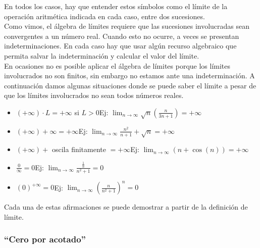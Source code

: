 \documentclass[../Teoría.root.tex]{subfiles}
\begin{document}
    En todos los casos, hay que entender estos símbolos como el límite de la operación aritmética indicada en cada caso, entre dos sucesiones.\\
    Como vimos, el álgebra de límites requiere que las sucesiones involucradas sean convergentes a un número real. Cuando esto no ocurre, a veces se presentan indeterminaciones. En cada caso hay que usar algún recurso algebraico que permita salvar la indeterminación y calcular el valor del límite.\\
    En ocasiones no es posible aplicar el álgebra de límites porque los límites involucrados no son finitos, sin embargo no estamos ante una indeterminación. A continuación damos algunas situaciones donde se puede saber el límite a pesar de que los límites involucrados no sean todos números reales.
    \begin{itemize}
        \item \((+\infty)\cdot L=+\infty\) si \(L>0\)\tab Ej: \(\lim_{n\to\infty}\sqrt{n}\left(\frac{n}{3n+1}\right)=+\infty\)
        \item \((+\infty)+\infty=+\infty\)\tab Ej: \(\lim_{n\to\infty}\frac{n^2}{n+1}+\sqrt{n}=+\infty\)
        \item \((+\infty)+\) oscila finitamente \(=+\infty\)\tab Ej: \(\lim_{n\to\infty}(n+\cos(n))=+\infty\)
        \item \(\frac{0}{\infty}=0\)\tab Ej: \(\lim_{n\to\infty}\frac{\frac{1}{n}}{n^2+1}=0\)
        \item \((0)^{+\infty}=0\)\tab Ej: \(\lim_{n\to\infty}\left(\frac{n}{n^2+1}\right)^n=0\)
    \end{itemize}
    Cada una de estas afirmaciones se puede demostrar a partir de la definición de límite.
    \subsubsection{``Cero por acotado''}
\end{document}
